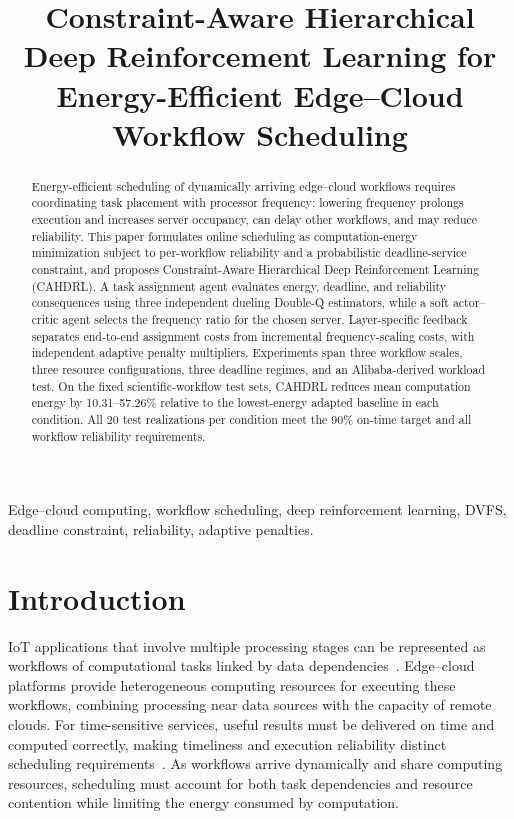 \documentclass[journal]{IEEEtran}
\begin{document}
\title{Constraint-Aware Hierarchical Deep Reinforcement Learning for Energy-Efficient Edge--Cloud Workflow Scheduling}
\author{}
\maketitle
\begin{abstract}
Energy-efficient scheduling of dynamically arriving edge--cloud workflows requires coordinating task placement with processor frequency: lowering frequency prolongs execution and increases server occupancy, can delay other workflows, and may reduce reliability. This paper formulates online scheduling as computation-energy minimization subject to per-workflow reliability and a probabilistic deadline-service constraint, and proposes Constraint-Aware Hierarchical Deep Reinforcement Learning (CAHDRL). A task assignment agent evaluates energy, deadline, and reliability consequences using three independent dueling Double-Q estimators, while a soft actor--critic agent selects the frequency ratio for the chosen server. Layer-specific feedback separates end-to-end assignment costs from incremental frequency-scaling costs, with independent adaptive penalty multipliers. Experiments span three workflow scales, three resource configurations, three deadline regimes, and an Alibaba-derived workload test. On the fixed scientific-workflow test sets, CAHDRL reduces mean computation energy by 10.31--57.26\% relative to the lowest-energy adapted baseline in each condition. All 20 test realizations per condition meet the 90\% on-time target and all workflow reliability requirements.
\end{abstract}
\begin{IEEEkeywords}
Edge--cloud computing, workflow scheduling, deep reinforcement learning, DVFS, deadline constraint, reliability, adaptive penalties.
\end{IEEEkeywords}

\section{Introduction}
IoT applications that involve multiple processing stages can be represented as workflows of computational tasks linked by data dependencies~\cite{taghinezhad2025}. Edge--cloud platforms provide heterogeneous computing resources for executing these workflows, combining processing near data sources with the capacity of remote clouds. For time-sensitive services, useful results must be delivered on time and computed correctly, making timeliness and execution reliability distinct scheduling requirements~\cite{siyadatzadeh2023relief}. As workflows arrive dynamically and share computing resources, scheduling must account for both task dependencies and resource contention while limiting the energy consumed by computation.
\end{document}
